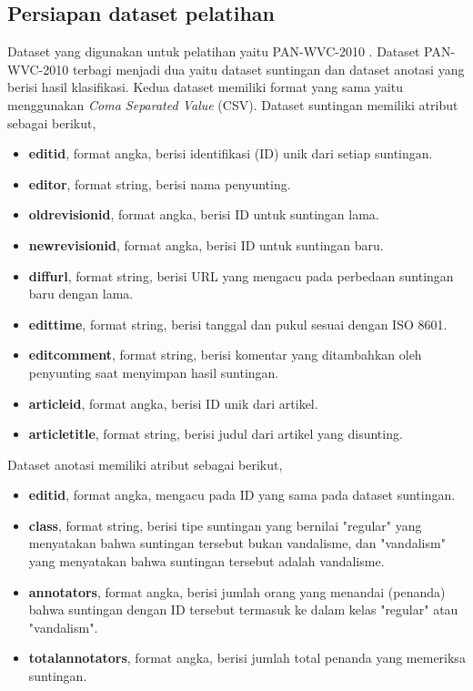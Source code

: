 \subsection{Persiapan dataset pelatihan}

Dataset yang digunakan untuk pelatihan yaitu PAN-WVC-2010
\cite{potthast:2010b}.
Dataset PAN-WVC-2010 terbagi menjadi dua yaitu dataset suntingan dan dataset
anotasi yang berisi hasil klasifikasi.
Kedua dataset memiliki format yang sama yaitu menggunakan \textit{Coma
Separated Value} (CSV).
Dataset suntingan memiliki atribut sebagai berikut,

\begin{itemize}
	\item \textbf{editid}, format angka, berisi identifikasi (ID) unik dari setiap suntingan.
	\item \textbf{editor}, format string, berisi nama penyunting.
	\item \textbf{oldrevisionid}, format angka, berisi ID untuk suntingan lama.
	\item \textbf{newrevisionid}, format angka, berisi ID untuk suntingan baru.
	\item \textbf{diffurl}, format string, berisi URL yang mengacu pada perbedaan suntingan baru dengan lama.
	\item \textbf{edittime}, format string, berisi tanggal dan pukul sesuai dengan ISO 8601.
	\item \textbf{editcomment}, format string, berisi komentar yang ditambahkan oleh penyunting saat menyimpan hasil suntingan.
	\item \textbf{articleid}, format angka, berisi ID unik dari artikel.
	\item \textbf{articletitle}, format string, berisi judul dari artikel yang disunting.
\end{itemize}

Dataset anotasi memiliki atribut sebagai berikut,
\begin{itemize}
	\item \textbf{editid}, format angka, mengacu pada ID yang sama pada
	dataset suntingan.
	\item \textbf{class}, format string, berisi tipe suntingan yang
	bernilai "regular" yang menyatakan bahwa suntingan tersebut bukan
	vandalisme, dan "vandalism" yang menyatakan bahwa suntingan tersebut
	adalah vandalisme.
	\item \textbf{annotators}, format angka, berisi jumlah orang yang
	menandai (penanda) bahwa suntingan dengan ID tersebut termasuk ke dalam
	kelas "regular" atau "vandalism".
	\item \textbf{totalannotators}, format angka, berisi jumlah total penanda yang memeriksa suntingan.
\end{itemize}

